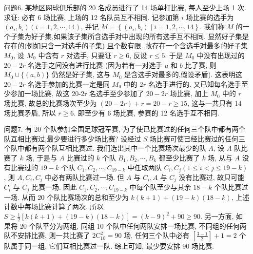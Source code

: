问题6. 某地区网球俱乐部的 20 名成员进行了 14 场单打比赛, 每人至少上场 1 次.
求证: 必有 6 场比赛, 上场的 12 名队员互不相同.
记参加第 $i$ 场比赛的选手为 $\left(a_i, b_i\right)(i=1,2, \cdots, 14)$, 并记 $M= \left\{\left(a_i, b_i\right) \mid i=1,2, \cdots, 14\right\}$. 我们称 $M$ 的一个子集为好子集,如果该子集所含选手对中出现的所有选手互不相同.
显然好子集是存在的(例如只含一对选手的子集) 且个数有限.
故存在一个含选手对最多的好子集 $M_0$, 设 $M_0$ 中含有 $r$ 对选手, 只要证 $r \geqslant 6$, 反设 $r \leqslant 5$. 于是 $M_0$ 中没有出现过的 $20-2 r$ 名选手之间没有进行比赛 (因为若有一对选手 $a$ 和 $b$ 比了赛, 则 $M_0 \cup\{(a, b)\}$ 仍然是好子集, 这与 $M_0$ 是含选手对最多的,假设矛盾). 这表明这 $20-2 r$ 名选手参加的比赛一定是同 $M_0$ 中的 $2 r$ 名选手进行的.
又已知每名选手至少参加一场比赛, 故这 20-2r 名选手至少参加了 $20-2 r$ 场比赛, 加上 $M_0$ 中的 $r$ 场比赛, 故总的比赛场次至少为 $(20-2 r)+r=20-r \geqslant 15$, 这与一共只有 14 场比赛矛盾, 所以 $r \geqslant 6$. 即至少有 6 场比赛, 参赛的 12 名选手互不相同.



问题7. 有 20 个队参加全国足球冠军赛, 为了使已比赛过的任何三个队中都有两个队互相比赛过,最少要进行多少场比赛?
设经过 $S$ 场比赛可使已经比赛过的任何三个队中都有两个队互相比赛过.
我们选出其中一个比赛场次最少的队 $A$, 设 $A$ 队比赛了 $k$ 场, 于是与 $A$ 比赛过的 $k$ 个队 $B_1, B_2, \cdots, B_k$ 都至少比赛了 $k$ 场, 从与 $A$ 没有比赛过的 $19-k$ 个队 $C_1, C_2, \cdots, C_{19-k}$ 中任取两队 $C_i, C_j(1 \leqslant i<j \leqslant 19-k)$, 则 $A, C_i, C_j$ 中必有两队比赛过一场.
但 $A$ 与 $C_i, A$ 与 $C_j$ 没有比赛过, 故只可能 $C_i$ 与 $C_j$ 比赛一场.
因此 $C_1, C_2, \cdots, C_{19-k}$ 中每个队至少与其余 $18-k$ 个队比赛过一场.
从而 20 个队比赛场次的总和至少为 $k(k+1)+(19-k)(18- k)$, 上述计数中每场比赛计算了两次.
所以 $S \geqslant \frac{1}{2}[k(k+1)+(19-k)(18- k)]=(k-9)^2+90 \geqslant 90$. 另一方面, 如果将 20 个队平分为两组, 同组 10 个队中任何两队安排一场比赛, 不同组的任何两队不安排比赛, 则一共比赛了 $2 \mathrm{C}_{10}^2=90$ 场, 任何三个队中必有 $\left[\frac{3-1}{2}\right]+1=2$ 个队属于同一组, 它们互相比赛过一队.
综上可知, 最少要安排 90 场比赛.


